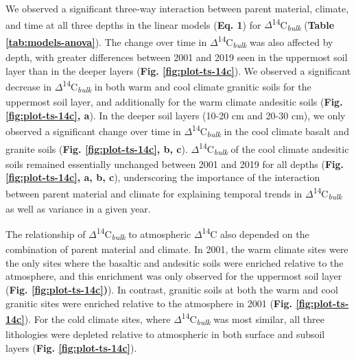 \documentclass[english,man,floatsintext]{apa6}
\begin{document}
We observed a significant three-way interaction between parent material, climate, and time at all three depths in the linear models (\textbf{Eq. 1}) for \(\Delta\)\textsuperscript{14}C\textsubscript{\emph{bulk}} (\textbf{Table \ref{tab:models-anova}}). The change over time in \(\Delta\)\textsuperscript{14}C\textsubscript{\emph{bulk}} was also affected by depth, with greater differences between 2001 and 2019 seen in the uppermost soil layer than in the deeper layers (\textbf{Fig. \ref{fig:plot-ts-14c}}). We observed a significant decrease in \(\Delta\)\textsuperscript{14}C\textsubscript{\emph{bulk}} in both warm and cool climate granitic soils for the uppermost soil layer, and additionally for the warm climate andesitic soils (\textbf{Fig. \ref{fig:plot-ts-14c}, a}). In the deeper soil layers (10-20 cm and 20-30 cm), we only observed a significant change over time in \(\Delta\)\textsuperscript{14}C\textsubscript{\emph{bulk}} in the cool climate basalt and granite soils (\textbf{Fig. \ref{fig:plot-ts-14c}, b, c}). \(\Delta\)\textsuperscript{14}C\textsubscript{\emph{bulk}} of the cool climate andesitic soils remained essentially unchanged between 2001 and 2019 for all depths (\textbf{Fig. \ref{fig:plot-ts-14c}, a, b, c}), underscoring the importance of the interaction between parent material and climate for explaining temporal trends in \(\Delta\)\textsuperscript{14}C\textsubscript{\emph{bulk}} as well as variance in a given year.

The relationship of \(\Delta\)\textsuperscript{14}C\textsubscript{\emph{bulk}} to atmospheric \(\Delta\)\textsuperscript{14}C also depended on the combination of parent material and climate. In 2001, the warm climate sites were the only sites where the basaltic and andesitic soils were enriched relative to the atmosphere, and this enrichment was only observed for the uppermost soil layer (\textbf{Fig. \ref{fig:plot-ts-14c})}). In contrast, granitic soils at both the warm and cool granitic sites were enriched relative to the atmosphere in 2001 (\textbf{Fig. \ref{fig:plot-ts-14c}}). For the cold climate sites, where \(\Delta\)\textsuperscript{14}C\textsubscript{\emph{bulk}} was most similar, all three lithologies were depleted relative to atmospheric in both surface and subsoil layers (\textbf{Fig. \ref{fig:plot-ts-14c}}).
\end{document}
